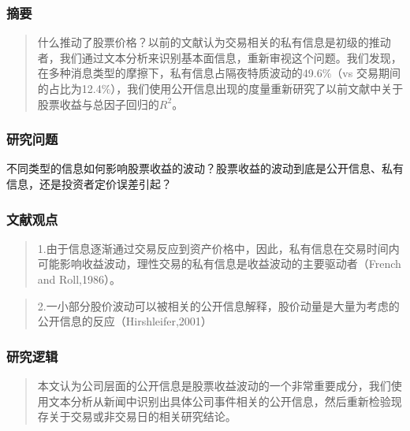 \documentclass[
]{article}
\begin{document}
\hypertarget{ux6458ux8981-2}{%
\subsubsection{摘要}\label{ux6458ux8981-2}}

\begin{quote}
什么推动了股票价格？以前的文献认为交易相关的私有信息是初级的推动者，我们通过文本分析来识别基本面信息，重新审视这个问题。我们发现，在多种消息类型的摩擦下，私有信息占隔夜特质波动的49.6\%（vs
交易期间的占比为12.4\%），我们使用公开信息出现的度量重新研究了以前文献中关于股票收益与总因子回归的\(R^2\)。
\end{quote}

\hypertarget{ux7814ux7a76ux95eeux9898-2}{%
\subsubsection{研究问题}\label{ux7814ux7a76ux95eeux9898-2}}

不同类型的信息如何影响股票收益的波动？股票收益的波动到底是公开信息、私有信息，还是投资者定价误差引起？

\hypertarget{ux6587ux732eux89c2ux70b9}{%
\subsubsection{文献观点}\label{ux6587ux732eux89c2ux70b9}}

\begin{quote}
1.由于信息逐渐通过交易反应到资产价格中，因此，私有信息在交易时间内可能影响收益波动，理性交易的私有信息是收益波动的主要驱动者（French
and Roll,1986）。
\end{quote}

\begin{quote}
2.一小部分股价波动可以被相关的公开信息解释，股价动量是大量为考虑的公开信息的反应（Hirshleifer,2001）
\end{quote}

\hypertarget{ux7814ux7a76ux903bux8f91-2}{%
\subsubsection{研究逻辑}\label{ux7814ux7a76ux903bux8f91-2}}

\begin{quote}
本文认为公司层面的公开信息是股票收益波动的一个非常重要成分，我们使用文本分析从新闻中识别出具体公司事件相关的公开信息，然后重新检验现存关于交易或非交易日的相关研究结论。
\end{quote}
\end{document}
